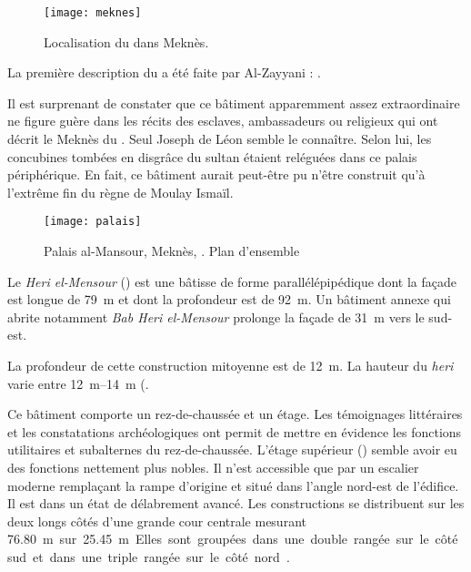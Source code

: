 \begin{figure}[htb]
  \texttt{[image: meknes]}
  \caption{Localisation du \PaM dans Meknès.}
  \label{fig:meknes}
\end{figure}

La première description du \PaM a été faite par Al-Zayyani : 
\autocite{Barrucand_1976}.

Il est surprenant de constater que ce bâtiment apparemment 
assez extraordinaire ne figure guère dans les récits des 
esclaves, ambassadeurs ou religieux qui ont décrit le Meknès du
. Seul Joseph de Léon semble le connaître. Selon lui, 
les concubines tombées en disgrâce du sultan étaient reléguées dans ce 
palais périphérique. En fait, ce bâtiment aurait peut-être pu n'être 
construit qu'à l’extrême fin du règne de Moulay Ismaïl.

\begin{figure}[htb]
  \texttt{[image: palais]}
  \caption{Palais al-Mansour, Meknès, . Plan d'ensemble 
           \autocite{Barrucand_1976}}
  \label{fig:palais}
\end{figure}

Le \emph{Heri el-Mensour} () est une bâtisse de forme 
parallélépipédique dont la façade est longue de \SI{79}{\m} et dont la 
profondeur est de \SI{92}{\m}. Un bâtiment annexe qui abrite notamment 
\emph{Bab Heri el-Mensour} prolonge la façade de \SI{31}{\m} vers le 
sud-est.

La profondeur de cette construction mitoyenne est de \SI{12}{\m}. 
La hauteur du \emph{heri} varie entre 
\SIrange[range-phrase=\ et\ ]{12}{14}{\m} (\autocite{Barrucand_1976}.

Ce bâtiment comporte un rez-de-chaussée et un étage. Les témoignages 
littéraires et les constatations archéologiques ont permit de mettre 
en évidence les fonctions utilitaires et subalternes du 
rez-de-chaussée. L'étage supérieur () semble avoir eu 
des fonctions nettement plus nobles. Il n'est accessible que par un 
escalier moderne remplaçant la rampe d'origine et situé dans l'angle 
nord-est de l'édifice. Il est dans un état de délabrement avancé. Les 
constructions se distribuent sur les deux longs côtés d'une grande 
cour centrale mesurant \SI{76.80}m sur \SI{25.45}{\m} Elles sont 
groupées dans une double rangée sur le côté sud et dans une triple 
rangée sur le côté nord \autocite{Barrucand_1976}.


